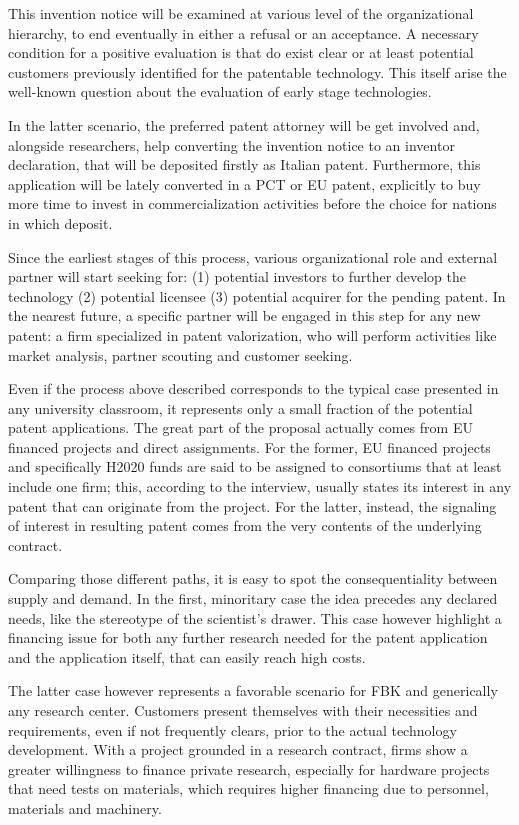 This invention notice will be examined at various level of the organizational hierarchy, to end eventually in either a refusal or an acceptance.  A necessary condition for a positive evaluation is that do exist clear or at least potential customers previously identified for the patentable technology. This itself arise the well-known question about the evaluation of early stage technologies.

In the latter scenario, the preferred patent attorney will be get involved and, alongside researchers, help converting the invention notice to an inventor declaration, that will be deposited firstly as Italian patent. Furthermore, this application will be lately converted in a PCT or EU patent, explicitly to buy more time to invest in commercialization activities before the choice for nations in which deposit. 

Since the earliest stages of this process, various organizational role and external partner will start seeking for: (1) potential investors to further develop the technology (2) potential licensee (3) potential acquirer for the pending patent. In the nearest future, a specific partner will be engaged in this step for any new patent: a firm specialized in patent valorization, who will perform activities like market analysis, partner scouting and customer seeking. 

Even if the process above described corresponds to the typical case presented in any university classroom, it represents only a small fraction of the potential patent applications. The great part of the proposal actually comes from EU financed projects and direct assignments. For the former, EU financed projects and specifically H2020 funds are said to be assigned to consortiums that at least include one firm; this, according to the interview, usually states its interest in any patent that can originate from the project. For the latter, instead, the signaling of interest in resulting patent comes from the very contents of the underlying contract.

Comparing those different paths, it is easy to spot the consequentiality between supply and demand. In the first, minoritary case the idea precedes any declared needs, like the stereotype of the scientist’s drawer. This case however highlight a financing issue for both any further research needed for the patent application and the application itself, that can easily reach high costs. 

The latter case however represents a favorable scenario for FBK and generically any research center. Customers present themselves with their necessities and requirements, even if not frequently clears, prior to the actual technology development. With a project grounded in a research contract, firms show a greater willingness to finance private research, especially for hardware projects that need tests on materials, which requires higher financing due to personnel, materials and machinery.

